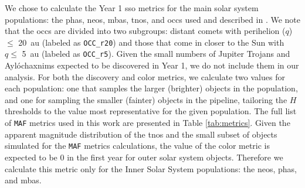 \documentclass[preprintm,linenumbers]{aastex631}
\newcommand{\maf}{\texttt{MAF}\xspace}
\newcommand{\occrfive}{\texttt{OCC\_r5}\xspace}
\newcommand{\occrtwenty}{\texttt{OCC\_r20}\xspace}
\begin{document}
We chose to calculate the Year 1 \gls*{sso} metrics for the main solar system populations: the \glspl*{pha}, \glspl*{neo}, \glspl*{mba}, \glspl*{tno}, and \glspl*{occ} used and described in \cite{schwambTuningLegacySurvey2023}. 
We note that the \glspl*{occ} are divided into two subgroups: distant comets with perihelion ($q$) $\le$ 20\ au (labeled as \occrtwenty) and those that come in closer to the Sun with $q \le$ 5\ au (labeled as \occrfive). %
Given the small numbers of Jupiter Trojans and \textquotesingle Ayl\'{o}\textquotesingle chaxnims \citep[Inner Venus objects (IVOs, ][]{bolinDiscoveryCharacterizationKilometre2022} expected to be discovered in Year 1, we do not include them in our analysis. 
For both the discovery and color metrics, we calculate two values for each population: one that samples the larger (brighter) objects in the population, and one for sampling the smaller (fainter) objects in the pipeline, tailoring the $H$ thresholds to the value most representative for the given population. 
The full list of \maf metrics used in this work are presented in Table \ref{tab:metrics}. 
Given the apparent magnitude distribution of the \glspl*{tno} and the small subset of objects simulated for the \maf metrics calculations, the value of the color metric is expected to be 0 in the first year for outer solar system objects. 
Therefore we calculate this metric only for the Inner Solar System populations: the \glspl*{neo}, \glspl*{pha}, and \glspl*{mba}. 


		
		
		
\end{document}

